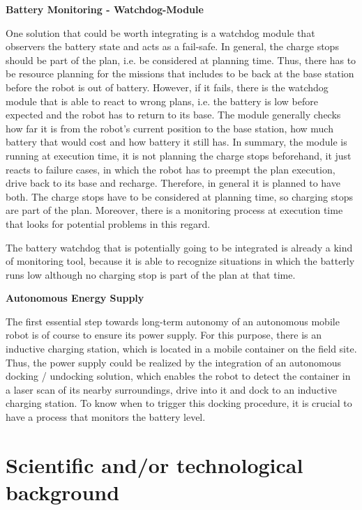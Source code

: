 \documentclass[german, master, expose, latin1]{base/thesis_KBS}
\begin{document}
\textbf{Battery Monitoring - Watchdog-Module}\newline

One solution that could be worth integrating is a watchdog module that observers the battery state and acts as a fail-safe. In general, the charge stops should
be part of the plan, i.e. be considered at planning time. Thus, there has to be resource planning for the missions that includes to be back at the base station before
the robot is out of battery. However, if it fails, there is the watchdog module that is able to react to wrong plans, i.e. the battery is low before expected and the 
robot has to return to its base. The module generally checks how far it is from the robot's current position to the base station, how much battery that would cost and
how battery it still has. In summary, the module is running at execution time, it is not planning the charge stops beforehand, it just reacts to failure cases, in which 
the robot has to preempt the plan execution, drive back to its base and recharge. Therefore, in general it is planned to have both. The charge stops have to be considered 
at planning time, so charging stops are part of the plan. Moreover, there is a monitoring process at execution time that looks for potential problems in this regard.\newline

The battery watchdog that is potentially going to be integrated is already a kind of monitoring tool, because it is able to recognize situations 
in which the batterly runs low although no charging stop is part of the plan at that time.\newline

\textbf{Autonomous Energy Supply}\newline

The first essential step towards long-term autonomy of an autonomous mobile robot is of course to ensure its power supply.
For this purpose, there is an inductive charging station, which is located in a mobile container on the field site.
Thus, the power supply could be realized by the integration of an autonomous docking / undocking solution, which enables the robot to detect
the container in a laser scan of its nearby surroundings, drive into it and dock to an inductive charging station.
To know when to trigger this docking procedure, it is crucial to have a process that monitors the battery level.\newline

\section{Scientific and/or technological background}
\end{document}
